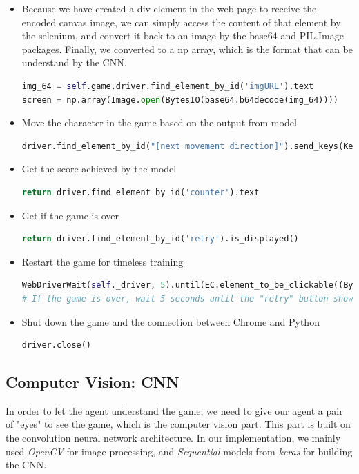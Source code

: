 \documentclass{article}
\begin{document}
\begin{itemize}
  \item Because we have created a div element in the web page to receive the encoded canvas image, we can simply access the content of that element by the selenium, and convert it back to an image by the base64 and PIL.Image packages. Finally, we converted to a np array, which is the format that can be understand by the CNN.
  \begin{lstlisting}[language=Python]
img_64 = self.game.driver.find_element_by_id('imgURL').text  
screen = np.array(Image.open(BytesIO(base64.b64decode(img_64))))
    \end{lstlisting}
  \item Move the character in the game based on the output from model
  \begin{lstlisting}[language=Python]
driver.find_element_by_id("[next movement direction]").send_keys(Keys.[Direction])
    \end{lstlisting}
    \item Get the score achieved by the model
    \begin{lstlisting}[language=Python]
return driver.find_element_by_id('counter').text
    \end{lstlisting}
    \item Get if the game is over
    \begin{lstlisting}[language=Python]
return driver.find_element_by_id('retry').is_displayed()
    \end{lstlisting}
    \item Restart the game for timeless training
    \begin{lstlisting}[language=Python]
WebDriverWait(self._driver, 5).until(EC.element_to_be_clickable((By.ID, "retry"))).click()
# If the game is over, wait 5 seconds until the "retry" button shown up and available to be clicked
    \end{lstlisting}
    \item Shut down the game and the connection between Chrome and Python
    \begin{lstlisting}[language=Python]
driver.close()
    \end{lstlisting}
\end{itemize}



\subsection{Computer Vision: CNN}
In order to let the agent understand the game, we need to give our agent a pair of "eyes" to see the game, which is the computer vision part. This part is built on the convolution neural network architecture. In our implementation, we mainly used \textit{OpenCV} for image processing, and \textit{Sequential} models from \textit{keras} for building the CNN.
\end{document}
